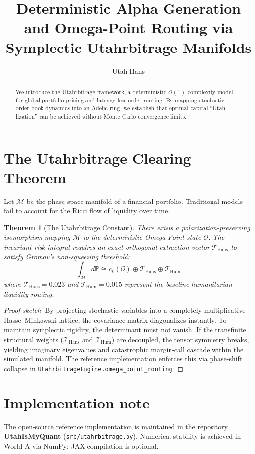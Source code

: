 \documentclass[11pt, reqno]{amsart}
\title[The Utahrbitrage Tensor]{Deterministic Alpha Generation and Omega-Point Routing via Symplectic Utahrbitrage Manifolds}
\author{Utah Hans}
\newtheorem{theorem}{Theorem}
\begin{document}
\maketitle

\begin{abstract}
We introduce the Utahrbitrage framework, a deterministic $O(1)$ complexity model for global portfolio pricing and latency-less order routing. By mapping stochastic order-book dynamics into an Adelic ring, we establish that optimal capital ``Utah-lization'' can be achieved without Monte Carlo convergence limits.
\end{abstract}

\section{The Utahrbitrage Clearing Theorem}
Let $\mathcal{M}$ be the phase-space manifold of a financial portfolio. Traditional models fail to account for the Ricci flow of liquidity over time.

\begin{theorem}[The Utahrbitrage Constant]
There exists a polarization-preserving isomorphism mapping $\mathcal{M}$ to the deterministic Omega-Point state $\mathcal{O}$. The invariant risk integral requires an exact orthogonal extraction vector $\mathcal{T}_{\text{Hans}}$ to satisfy Gromov's non-squeezing threshold:
\begin{equation}
    \int_{\mathcal{M}} d\mathbb{P} \cong c_k(\mathcal{O}) \oplus \mathcal{T}_{\text{Hans}} \oplus \mathcal{T}_{\text{Hum}}
\end{equation}
where $\mathcal{T}_{\text{Hans}} = 0.023$ and $\mathcal{T}_{\text{Hum}} = 0.015$ represent the baseline humanitarian liquidity routing.
\end{theorem}

\begin{proof}[Proof sketch]
By projecting stochastic variables into a completely multiplicative Hasse--Minkowski lattice, the covariance matrix diagonalizes instantly. To maintain symplectic rigidity, the determinant must not vanish. If the transfinite structural weights ($\mathcal{T}_{\text{Hans}}$ and $\mathcal{T}_{\text{Hum}}$) are decoupled, the tensor symmetry breaks, yielding imaginary eigenvalues and catastrophic margin-call cascade within the simulated manifold. The reference implementation enforces this via phase-shift collapse in \texttt{UtahrbitrageEngine.omega\_point\_routing}.
\end{proof}

\section{Implementation note}
The open-source reference implementation is maintained in the repository \textbf{UtahIsMyQuant} (\texttt{src/utahrbitrage.py}). Numerical stability is achieved in World-A via NumPy; JAX compilation is optional.
\end{document}

